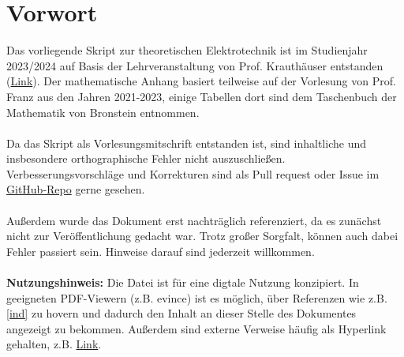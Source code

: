 \chapter*{Vorwort}
Das vorliegende Skript zur theoretischen Elektrotechnik ist im Studienjahr 2023/2024 auf Basis der Lehrveranstaltung von Prof. Krauthäuser entstanden (\href{https://github.com/hgkdd/TET}{Link}). Der mathematische Anhang basiert teilweise auf der Vorlesung von Prof. Franz aus den Jahren 2021-2023, einige Tabellen dort sind dem Taschenbuch der Mathematik von Bronstein entnommen.\\\\
Da das Skript als Vorlesungsmitschrift entstanden ist, sind inhaltliche und insbesondere orthographische Fehler nicht auszuschließen. Verbesserungsvorschläge und Korrekturen sind als Pull request oder Issue im \href{https://github.com/henningf3/tet}{GitHub-Repo} gerne gesehen.\\\\
Außerdem wurde das Dokument erst nachträglich referenziert, da es zunächst nicht zur Veröffentlichung gedacht war. Trotz großer Sorgfalt, können auch dabei Fehler passiert sein. Hinweise darauf sind jederzeit willkommen.\\\\
\textbf{Nutzungshinweis:} Die Datei ist für eine digtale Nutzung konzipiert. In geeigneten PDF-Viewern (z.B. evince) ist es möglich, über Referenzen wie z.B. \ref{ind} zu hovern und dadurch den Inhalt an dieser Stelle des Dokumentes angezeigt zu bekommen. Außerdem sind externe Verweise häufig als Hyperlink gehalten, z.B. \href{https://github.com/hgkdd/TET}{Link}.


\tableofcontents











\appendix





